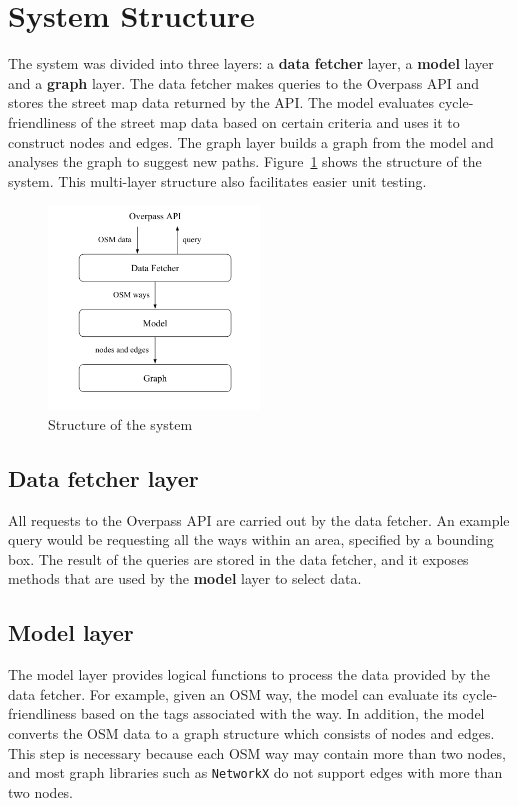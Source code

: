\documentclass[12pt,a4paper]{report}
\begin{document}
\section{System Structure}
The system was divided into three layers: a \textbf{data fetcher} layer, a \textbf{model} layer and a \textbf{graph} layer. The data fetcher makes queries to the Overpass API and stores the street map data returned by the API. The model evaluates cycle-friendliness of the street map data based on certain criteria and uses it to construct nodes and edges. The graph layer builds a graph from the model and analyses the graph to suggest new paths. Figure~\ref{fig:structure} shows the structure of the system. This multi-layer structure also facilitates easier unit testing.

\begin{figure}[ht]
    \centering
    \includegraphics[width=0.5\textwidth]{plan_images/multi_layer.png}
    \caption{Structure of the system}
    \label{fig:structure}
\end{figure}

\subsection{Data fetcher layer}
All requests to the Overpass API are carried out by the data fetcher. An example query would be requesting all the ways within an area, specified by a bounding box. The result of the queries are stored in the data fetcher, and it exposes methods that are used by the \textbf{model} layer to select data.

\subsection{Model layer}
The model layer provides logical functions to process the data provided by the data fetcher. For example, given an OSM way, the model can evaluate its cycle-friendliness based on the tags associated with the way. In addition, the model converts the OSM data to a graph structure which consists of nodes and edges. This step is necessary because each OSM way may contain more than two nodes, and most graph libraries such as \texttt{NetworkX} do not support edges with more than two nodes. 
\end{document}
